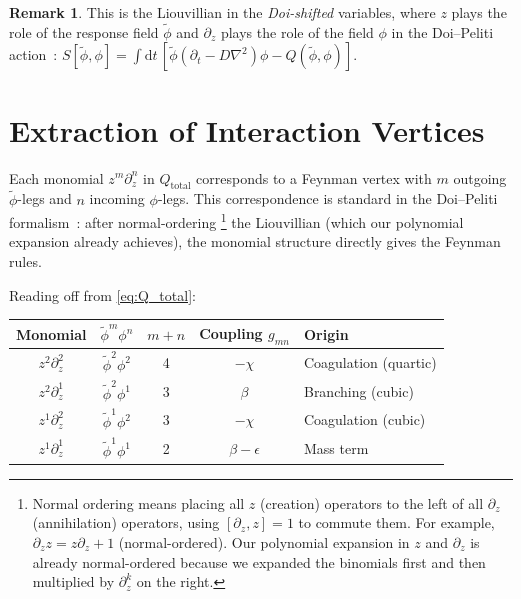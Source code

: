 \documentclass[11pt,a4paper]{article}
\theoremstyle{definition}
\newtheorem*{remark}{Remark}
\newcommand{\dd}{\mathrm{d}}
\newcommand{\phit}{\tilde{\phi}}
\begin{document}
\begin{remark}
This is the Liouvillian in the \emph{Doi-shifted} variables, where
$z$ plays the role of the response field $\phit$ and $\partial_z$
plays the role of the field $\phi$ in the Doi--Peliti
action~\cite{peliti1985,tauber2005}:
$S[\phit, \phi] = \int \dd t\, [\phit(\partial_t - D\nabla^2)\phi - Q(\phit, \phi)]$.
\end{remark}

\section{Extraction of Interaction Vertices}
\label{sec:vertices}

Each monomial $z^m \partial_z^n$ in $Q_{\mathrm{total}}$ corresponds to a
Feynman vertex with $m$ outgoing $\phit$-legs and $n$ incoming $\phi$-legs.
This correspondence is standard in the Doi--Peliti
formalism~\cite{tauber2005,amarteifio2019}: after normal-ordering%
\footnote{Normal ordering means placing all $z$ (creation) operators to the
left of all $\partial_z$ (annihilation) operators, using $[\partial_z, z] = 1$
to commute them. For example, $\partial_z z = z\partial_z + 1$ (normal-ordered).
Our polynomial expansion in $z$ and $\partial_z$ is already normal-ordered
because we expanded the binomials first and then multiplied by $\partial_z^k$
on the right.}
the Liouvillian (which our polynomial expansion already achieves), the
monomial structure directly gives the Feynman rules.

Reading off from \eqref{eq:Q_total}:

\begin{center}
\renewcommand{\arraystretch}{1.3}
\begin{tabular}{ccccl}
\toprule
Monomial & $\phit^m \phi^n$ & $m + n$ & Coupling $g_{mn}$ & Origin \\
\midrule
$z^2 \partial_z^2$ & $\phit^2 \phi^2$ & 4 & $-\chi$ & Coagulation (quartic) \\
$z^2 \partial_z^1$ & $\phit^2 \phi^1$ & 3 & $\beta$ & Branching (cubic) \\
$z^1 \partial_z^2$ & $\phit^1 \phi^2$ & 3 & $-\chi$ & Coagulation (cubic) \\
$z^1 \partial_z^1$ & $\phit^1 \phi^1$ & 2 & $\beta - \epsilon$ & Mass term \\
\bottomrule
\end{tabular}
\end{center}
\end{document}
